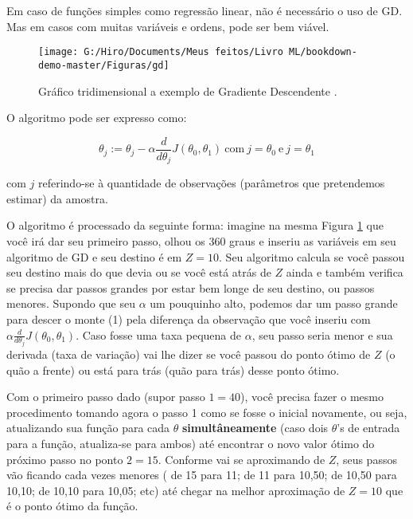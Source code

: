 \documentclass[
  openany]{book}
\begin{document}
Em caso de funções simples como regressão linear, não é necessário o uso de GD. Mas em casos com muitas variáveis e ordens, pode ser bem viável.

\begin{figure}

{\centering \texttt{[image: G:/Hiro/Documents/Meus feitos/Livro ML/bookdown-demo-master/Figuras/gd]} 

}

\caption{Gráfico tridimensional a exemplo de Gradiente Descendente \citep{andrewcoursera}.}\label{fig:gd}
\end{figure}



O algoritmo pode ser expresso como:

\begin{equation}
    \theta_j := \theta_j - \alpha \frac{d}{d \theta_j}J(\theta_0,\theta_1) \ \mbox{com} \ j=\theta_0 \ \mbox{e} \ j=\theta_1 
    \label{eq:GD}
\end{equation}

com \(j\) referindo-se à quantidade de observações (parâmetros que pretendemos estimar) da amostra.

O algoritmo é processado da seguinte forma: imagine na mesma Figura \ref{fig:gd} que você irá dar seu primeiro passo, olhou os 360 graus e inseriu as variáveis em seu algoritmo de GD e seu destino é em \(Z=10\). Seu algoritmo calcula se você passou seu destino mais do que devia ou se você está atrás de \(Z\) ainda e também verifica se precisa dar passos grandes por estar bem longe de seu destino, ou passos menores. Supondo que seu \(\alpha\) um pouquinho alto, podemos dar um passo grande para descer o monte (1) pela diferença da observação que você inseriu com \(\alpha \frac{d}{d \theta_j}J(\theta_0,\theta_1)\). Caso fosse uma taxa pequena de \(\alpha\), seu passo seria menor e sua derivada (taxa de variação) vai lhe dizer se você passou do ponto ótimo de \(Z\) (o quão a frente) ou está para trás (quão para trás) desse ponto ótimo.

Com o primeiro passo dado (supor passo \(1 = 40\)), você precisa fazer o mesmo procedimento tomando agora o passo 1 como se fosse o inicial novamente, ou seja, atualizando sua função para cada \(\theta\) \textbf{simultâneamente} (caso dois \(\theta\)'s de entrada para a função, atualiza-se para ambos) até encontrar o novo valor ótimo do próximo passo no ponto \(2=15\). Conforme vai se aproximando de \(Z\), seus passos vão ficando cada vezes menores ( de 15 para 11; de 11 para 10,50; de 10,50 para 10,10; de 10,10 para 10,05; etc) até chegar na melhor aproximação de \(Z=10\) que é o ponto ótimo da função.
\end{document}

